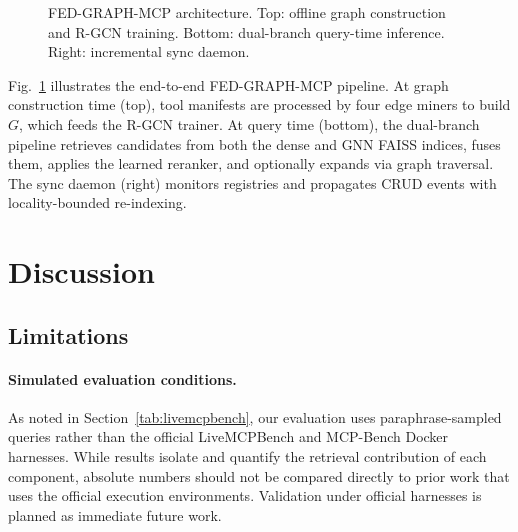 \documentclass[conference]{IEEEtran}
\begin{document}
\begin{figure}[htbp]
\caption{FED-GRAPH-MCP architecture. Top: offline graph construction
and R-GCN training. Bottom: dual-branch query-time inference. Right:
incremental sync daemon.}
\label{fig:architecture}
\end{figure}

Fig.~\ref{fig:architecture} illustrates the end-to-end FED-GRAPH-MCP
pipeline. At graph construction time (top), tool manifests are
processed by four edge miners to build $G$, which feeds the R-GCN
trainer. At query time (bottom), the dual-branch pipeline retrieves
candidates from both the dense and GNN FAISS indices, fuses them,
applies the learned reranker, and optionally expands via graph
traversal. The sync daemon (right) monitors registries and propagates
CRUD events with locality-bounded re-indexing.


\section{Discussion}

\subsection{Limitations}

\paragraph{Simulated evaluation conditions.}
As noted in Section~\ref{tab:livemcpbench}, our evaluation uses
paraphrase-sampled queries rather than the official LiveMCPBench and
MCP-Bench Docker harnesses. While results isolate and quantify the
retrieval contribution of each component, absolute numbers should not
be compared directly to prior work that uses the official execution
environments. Validation under official harnesses is planned as
immediate future work.
\end{document}
